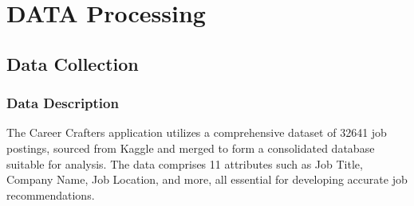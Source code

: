 \documentclass[a4paper,10pt]{article}
\begin{document}






\section{DATA Processing}

\subsection{Data Collection}

    \subsubsection{Data Description}
    The Career Crafters application utilizes a comprehensive dataset of 32641 job postings, sourced from Kaggle and merged to form a consolidated database suitable for analysis. The data comprises 11 attributes such as Job Title, Company Name, Job Location, and more, all essential for developing accurate job recommendations.
\end{document}
